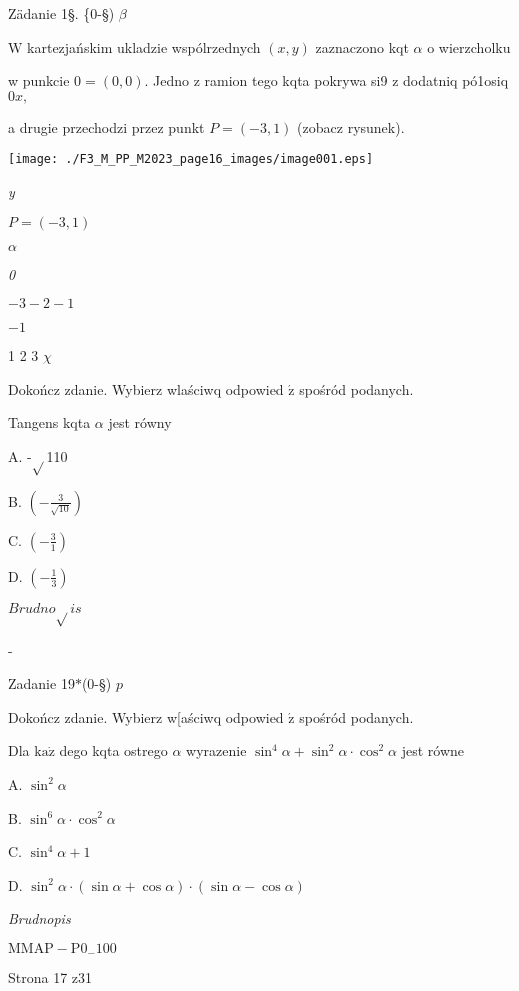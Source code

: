 \documentclass[a4paper,12pt]{article}
\begin{document}
Zädanie 1\S. \{0-\S) $\beta$

$\mathrm{W}$ kartezjańskim ukladzie wspólrzednych $(x,y)$ zaznaczono kqt $\alpha$ o wierzcholku

w punkcie $0=(0,0)$. Jedno z ramion tego kqta pokrywa si9 z dodatniq pó1osiq $0x,$

a drugie przechodzi przez punkt $P=(-3,1)$ (zobacz rysunek).
\begin{center}
\texttt{[image: ./F3\_M\_PP\_M2023\_page16\_images/image001.eps]}
\end{center}
{\it y}

$P=(-3,1)$

$\alpha$

{\it 0}

$-3 -2 -1$

$-1$

1 2  3  $\chi$

Dokończ zdanie. Wybierz wlaściwq odpowied $\acute{\mathrm{z}}$ spośród podanych.

Tangens kqta $\alpha$ jest równy

A. -$\sqrt{}$110

B. $(-\displaystyle \frac{3}{\sqrt{10}})$

C. $(-\displaystyle \frac{3}{1})$

D. $(-\displaystyle \frac{1}{3})$

$Brudno\sqrt{}is$

-

Zadanie 19$*$(0-\S) $p$

Dokończ zdanie. Wybierz w[aściwq odpowied $\acute{\mathrm{z}}$ spośród podanych.

Dla $\mathrm{k}\mathrm{a}\dot{\mathrm{z}}$ dego kqta ostrego $\alpha$ wyrazenie $\sin^{4}\alpha +\sin^{2}\alpha\cdot\cos^{2}\alpha$ jest równe

A. $\sin^{2}\alpha$

B. $\sin^{6}\alpha\cdot\cos^{2}\alpha$

C. $\sin^{4}\alpha+1$

D. $\sin^{2}\alpha\cdot(\sin\alpha+\cos\alpha)\cdot(\sin\alpha-\cos\alpha)$

{\it Brudnopis}

$\mathrm{M}\mathrm{M}\mathrm{A}\mathrm{P}-\mathrm{P}0_{-}100$

Strona 17 z31
\end{document}
